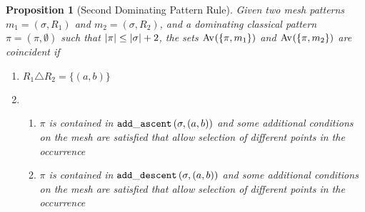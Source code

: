 \documentclass[11pt,a4paper]{article}
\newtheorem{proposition}[theorem]{Proposition}
\theoremstyle{definition}
\begin{document}
\begin{proposition}[Second Dominating Pattern Rule]
    \label{prop:dom2}
    Given two mesh patterns \(m_1 =(\sigma, R_1)\) and \(m_2 = (\sigma, R_2)\),
    and a dominating classical pattern \(\pi = (\pi,\emptyset)\) such that
    \(\left|\pi\right| \le \left|\sigma\right| + 2\), the sets \(\operatorname{Av}_{}\!\left(\{\pi,m_1\}\right)\) and
    \(\operatorname{Av}_{}\!\left(\{\pi,m_2\}\right)\) are coincident if

    \begin{enumerate}
        \item \(R_1 \triangle R_2 = \{(a,b)\}\)
        \item   \begin{enumerate}
                \item\label{prop:dom2:condc} \(\pi \) is contained in
                \( \mathtt{add\_ascent}\left(\sigma, (a,b)\right)\) and some additional conditions on the
                mesh are satisfied that allow selection of different points in
                the occurrence
                \item \(\pi \) is contained in \( \mathtt{add\_descent}\left(\sigma, (a,b)\right)\) and
                some additional conditions on the
                mesh are satisfied that allow selection of different points in
                the occurrence

\end{enumerate}
\end{enumerate}
\end{proposition}
\end{document}
